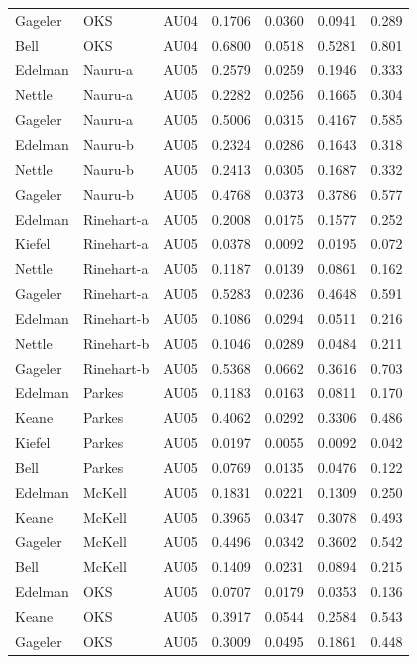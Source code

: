 \documentclass{monashthesis}
\begin{document}
\begin{center}
\begin{longtable}{lllllll}
Gageler & OKS & AU04 & 0.1706 & 0.0360 & 0.0941 & 0.289 \\
Bell & OKS & AU04 & 0.6800 & 0.0518 & 0.5281 & 0.801 \\
Edelman & Nauru-a & AU05 & 0.2579 & 0.0259 & 0.1946 & 0.333 \\
Nettle & Nauru-a & AU05 & 0.2282 & 0.0256 & 0.1665 & 0.304 \\
Gageler & Nauru-a & AU05 & 0.5006 & 0.0315 & 0.4167 & 0.585 \\
Edelman & Nauru-b & AU05 & 0.2324 & 0.0286 & 0.1643 & 0.318 \\
Nettle & Nauru-b & AU05 & 0.2413 & 0.0305 & 0.1687 & 0.332 \\
Gageler & Nauru-b & AU05 & 0.4768 & 0.0373 & 0.3786 & 0.577 \\
Edelman & Rinehart-a & AU05 & 0.2008 & 0.0175 & 0.1577 & 0.252 \\
Kiefel & Rinehart-a & AU05 & 0.0378 & 0.0092 & 0.0195 & 0.072 \\
Nettle & Rinehart-a & AU05 & 0.1187 & 0.0139 & 0.0861 & 0.162 \\
Gageler & Rinehart-a & AU05 & 0.5283 & 0.0236 & 0.4648 & 0.591 \\
Edelman & Rinehart-b & AU05 & 0.1086 & 0.0294 & 0.0511 & 0.216 \\
Nettle & Rinehart-b & AU05 & 0.1046 & 0.0289 & 0.0484 & 0.211 \\
Gageler & Rinehart-b & AU05 & 0.5368 & 0.0662 & 0.3616 & 0.703 \\
Edelman & Parkes & AU05 & 0.1183 & 0.0163 & 0.0811 & 0.170 \\
Keane & Parkes & AU05 & 0.4062 & 0.0292 & 0.3306 & 0.486 \\
Kiefel & Parkes & AU05 & 0.0197 & 0.0055 & 0.0092 & 0.042 \\
Bell & Parkes & AU05 & 0.0769 & 0.0135 & 0.0476 & 0.122 \\
Edelman & McKell & AU05 & 0.1831 & 0.0221 & 0.1309 & 0.250 \\
Keane & McKell & AU05 & 0.3965 & 0.0347 & 0.3078 & 0.493 \\
Gageler & McKell & AU05 & 0.4496 & 0.0342 & 0.3602 & 0.542 \\
Bell & McKell & AU05 & 0.1409 & 0.0231 & 0.0894 & 0.215 \\
Edelman & OKS & AU05 & 0.0707 & 0.0179 & 0.0353 & 0.136 \\
Keane & OKS & AU05 & 0.3917 & 0.0544 & 0.2584 & 0.543 \\
Gageler & OKS & AU05 & 0.3009 & 0.0495 & 0.1861 & 0.448 \\

\end{longtable}
\end{center}
\end{document}

